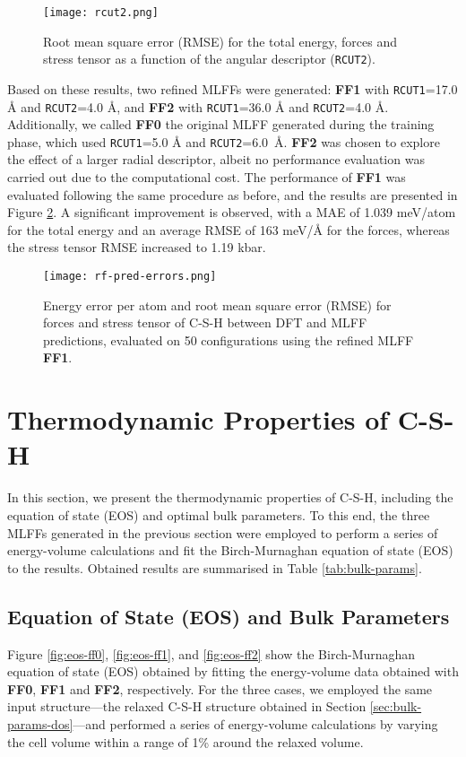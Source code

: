 \begin{figure}[h]
    \centering
    \texttt{[image: rcut2.png]}
    \caption{
    Root mean square error (RMSE) for the total energy, forces and stress tensor as a function of the angular descriptor (\texttt{RCUT2}).
    }
    \label{rcut2}
\end{figure}

Based on these results, two refined MLFFs were generated: \textbf{FF1} with \texttt{RCUT1}=17.0 Å and \texttt{RCUT2}=4.0 Å, and \textbf{FF2} with \texttt{RCUT1}=36.0 Å and \texttt{RCUT2}=4.0 Å. Additionally, we called \textbf{FF0} the original MLFF generated during the training phase, which used \texttt{RCUT1}=5.0 Å and \texttt{RCUT2}=6.0~Å. \textbf{FF2} was chosen to explore the effect of a larger radial descriptor, albeit no performance evaluation was carried out due to the computational cost. 
The performance of \textbf{FF1} was evaluated following the same procedure as before, and the results are presented in Figure \ref{rf-pred-errors}. A significant improvement is observed, with a MAE of  1.039 meV/atom for the total energy and an average RMSE of 163 meV/Å for the forces, whereas the stress tensor RMSE increased to 1.19 kbar.
\begin{figure}[h]
    \centering
    \texttt{[image: rf-pred-errors.png]}
    \caption{
    Energy error per atom and root mean square error (RMSE) for forces and stress tensor of C-S-H between DFT and MLFF predictions, evaluated on 50 configurations using the refined MLFF \textbf{FF1}.  
    }
    \label{rf-pred-errors}
\end{figure}
\section{Thermodynamic Properties of C-S-H}
\label{sec:thermo-properties}
In this section, we present the thermodynamic properties of C-S-H, including the equation of state (EOS) and optimal bulk parameters. To this end, the three MLFFs generated in the previous section were employed to perform a series of energy-volume calculations and fit the Birch-Murnaghan equation of state (EOS) to the results. Obtained results are summarised in Table \ref{tab:bulk-params}.

\subsection{Equation of State (EOS) and Bulk Parameters}
Figure \ref{fig:eos-ff0}, \ref{fig:eos-ff1}, and \ref{fig:eos-ff2} show the Birch-Murnaghan equation of state (EOS) obtained by fitting the energy-volume data obtained with \textbf{FF0}, \textbf{FF1} and \textbf{FF2}, respectively.  For the three cases, we employed the same input structure---the relaxed C-S-H structure obtained in Section \ref{sec:bulk-params-dos}---and performed a series of energy-volume calculations by varying the cell volume within a range of 1\% around the relaxed volume. 


